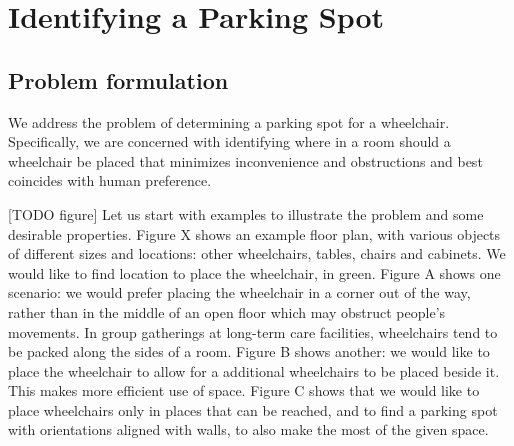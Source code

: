 \chapter{Identifying a Parking Spot}


\section{Problem formulation}
We address the problem of determining a parking spot for a wheelchair.
Specifically, we are concerned with identifying where in a room should a
wheelchair be placed that minimizes inconvenience and obstructions and best
coincides with human preference.

[TODO figure]
Let us start with examples to illustrate the problem and some desirable
properties.
Figure X shows an example floor plan, with various objects of different sizes
and locations: other wheelchairs, tables, chairs and cabinets. We would like to
find location to place the wheelchair, in green.  Figure A shows one scenario:
we would prefer placing the wheelchair in a corner out of the way, rather than
in the middle of an open floor which may obstruct people's movements.  In group
gatherings at long-term care facilities, wheelchairs tend to be packed along the
sides of a room.
Figure B
shows another: we would like to place the wheelchair to allow for a additional
wheelchairs to be placed beside it. This makes more efficient use of space.
Figure C shows that we would like to place wheelchairs only in places that can
be reached, and to find a parking spot with orientations aligned with walls, to
also make the most of the given space.

